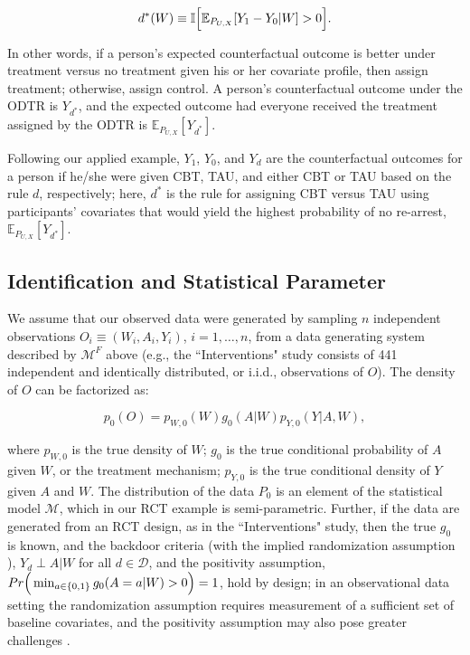 \documentclass[a4paper,12pt]{article}
\begin{document}
\[d^*(W)\equiv \mathbb{I}\Big{[}\mathbb{E}_{P_{U,X}}[Y_1-Y_0|W] > 0\Big{]}.\]

In other words, if a person's expected counterfactual outcome is better under treatment versus no treatment given his or her covariate profile, then assign treatment; otherwise, assign control. A person’s counterfactual outcome under the ODTR is $Y_{d^*}$, and the expected outcome had everyone received the treatment assigned by the ODTR is $\mathbb{E}_{P_{U,X}}[Y_{d^*}]$.

Following our applied example, $Y_1$, $Y_0$, and $Y_d$ are the counterfactual outcomes for a person if he/she were given CBT, TAU, and either CBT or TAU based on the rule $d$, respectively; here, $d^*$ is the rule for assigning CBT versus TAU using participants' covariates that would yield the highest probability of no re-arrest, $\mathbb{E}_{P_{U,X}}[Y_{d^*}]$.

\subsection{Identification and Statistical Parameter}

We assume that our observed data were generated by sampling $n$ independent observations $O_i \equiv (W_i, A_i, Y_i)$, $i = 1, \ldots, n$, from a data generating system described by $\mathcal{M}^F$ above (e.g., the ``Interventions" study consists of 441 independent and identically distributed, or i.i.d., observations of $O$). The density of $O$ can be factorized as:

\[p_0(O)=p_{W,0}(W)g_0(A|W)p_{Y,0}(Y|A,W),\]

\noindent where $p_{W,0}$ is the true density of $W$; $g_0$ is the true conditional probability of $A$ given $W$, or the treatment mechanism; $p_{Y,0}$ is the true conditional density of $Y$ given $A$ and $W$. The distribution of the data $P_0$ is an element of the statistical model $\mathcal{M}$, which in our RCT example is semi-parametric. Further, if the data are generated from an RCT design, as in the ``Interventions" study, then the true $g_0$ is known, and the backdoor criteria (with the implied randomization assumption \citep{pearl2000causality, robins2009estimation}), $Y_d \perp A|W$ for all $d \in \mathcal{D}$, and the positivity assumption, $Pr\Big{(}\min_{a\in \{0,1\}} g_0 (A=a | W)>0\Big{)} =1$, hold by design; in an observational data setting the randomization assumption requires measurement of a sufficient set of baseline covariates, and the positivity assumption may also pose greater challenges \citep{petersen2012diagnosing}. 
\end{document}
